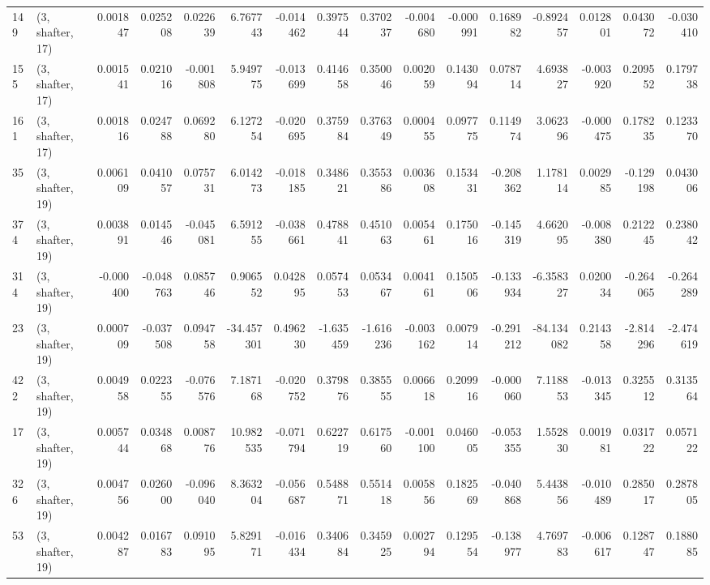 \begin{tabular}{llrrrrrrrrrrrrrr}
149 &  (3, shafter, 17) &   0.001847 &  0.025208 &  0.022639 &    6.767743 & -0.014462 &   0.397544 &  0.370237 & -0.004680 & -0.000991 &  0.168982 &   -0.892457 &  0.012801 &  0.043072 & -0.030410 \\
155 &  (3, shafter, 17) &   0.001541 &  0.021016 & -0.001808 &    5.949775 & -0.013699 &   0.414658 &  0.350046 &  0.002059 &  0.143094 &  0.078714 &    4.693827 & -0.003920 &  0.209552 &  0.179738 \\
161 &  (3, shafter, 17) &   0.001816 &  0.024788 &  0.069280 &    6.127254 & -0.020695 &   0.375984 &  0.376349 &  0.000455 &  0.097775 &  0.114974 &    3.062396 & -0.000475 &  0.178235 &  0.123370 \\
35  &  (3, shafter, 19) &   0.006109 &  0.041057 &  0.075731 &    6.014273 & -0.018185 &   0.348621 &  0.355386 &  0.003608 &  0.153431 & -0.208362 &    1.178114 &  0.002985 & -0.129198 &  0.043006 \\
374 &  (3, shafter, 19) &   0.003891 &  0.014546 & -0.045081 &    6.591255 & -0.038661 &   0.478841 &  0.451063 &  0.005461 &  0.175016 & -0.145319 &    4.662095 & -0.008380 &  0.212245 &  0.238042 \\
314 &  (3, shafter, 19) &  -0.000400 & -0.048763 &  0.085746 &    0.906552 &  0.042895 &   0.057453 &  0.053467 &  0.004161 &  0.150506 & -0.133934 &   -6.358327 &  0.020034 & -0.264065 & -0.264289 \\
23  &  (3, shafter, 19) &   0.000709 & -0.037508 &  0.094758 &  -34.457301 &  0.496230 &  -1.635459 & -1.616236 & -0.003162 &  0.007914 & -0.291212 &  -84.134082 &  0.214358 & -2.814296 & -2.474619 \\
422 &  (3, shafter, 19) &   0.004958 &  0.022355 & -0.076576 &    7.187168 & -0.020752 &   0.379876 &  0.385555 &  0.006618 &  0.209916 & -0.000060 &    7.118853 & -0.013345 &  0.325512 &  0.313564 \\
17  &  (3, shafter, 19) &   0.005744 &  0.034868 &  0.008776 &   10.982535 & -0.071794 &   0.622719 &  0.617560 & -0.001100 &  0.046005 & -0.053355 &    1.552830 &  0.001981 &  0.031722 &  0.057122 \\
326 &  (3, shafter, 19) &   0.004756 &  0.026000 & -0.096040 &    8.363204 & -0.056687 &   0.548871 &  0.551418 &  0.005856 &  0.182569 & -0.040868 &    5.443856 & -0.010489 &  0.285017 &  0.287805 \\
53  &  (3, shafter, 19) &   0.004287 &  0.016783 &  0.091095 &    5.829171 & -0.016434 &   0.340684 &  0.345925 &  0.002794 &  0.129554 & -0.138977 &    4.769783 & -0.006617 &  0.128747 &  0.188085 \\

\end{tabular}
